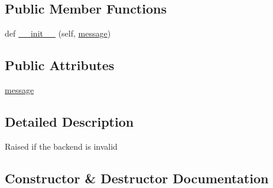 \subsection*{Public Member Functions}
\begin{DoxyCompactItemize}
\item 
def \hyperlink{classpip_1_1__vendor_1_1pep517_1_1in__process_1_1__in__process_1_1BackendInvalid_a083767017bb3f3f4f628c9aad37a026b}{\+\_\+\+\_\+init\+\_\+\+\_\+} (self, \hyperlink{classpip_1_1__vendor_1_1pep517_1_1in__process_1_1__in__process_1_1BackendInvalid_ad9d366caa846be0c0d022851ac5a99d7}{message})
\end{DoxyCompactItemize}
\subsection*{Public Attributes}
\begin{DoxyCompactItemize}
\item 
\hyperlink{classpip_1_1__vendor_1_1pep517_1_1in__process_1_1__in__process_1_1BackendInvalid_ad9d366caa846be0c0d022851ac5a99d7}{message}
\end{DoxyCompactItemize}


\subsection{Detailed Description}
\begin{DoxyVerb}Raised if the backend is invalid\end{DoxyVerb}
 

\subsection{Constructor \& Destructor Documentation}
\mbox{\label{classpip_1_1__vendor_1_1pep517_1_1in__process_1_1__in__process_1_1BackendInvalid_a083767017bb3f3f4f628c9aad37a026b}} 
